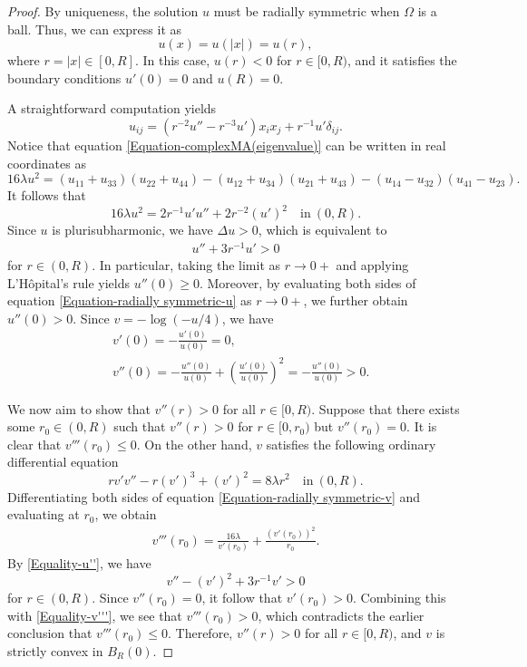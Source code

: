 \documentclass[10pt,a4paper]{amsart}
\begin{document}
\begin{proof}
By uniqueness, the solution $u$ must be radially symmetric when $\Omega$ is a ball. Thus, we can express it as $$u(x)=u(|x|)=u(r), $$ where $r=|x|\in[0,R]$. In this case, $u(r)<0$ for $r\in[0, R)$, and it satisfies the boundary conditions $u'(0)=0$ and $u(R)=0$.
 
A straightforward computation yields $$u_{ij}=\left(r^{-2}u''-r^{-3}u'\right)x_ix_j+r^{-1}u'\delta_{ij}. $$ Notice that equation \eqref{Equation-complexMA(eigenvalue)} can be written in real coordinates as $$16\lambda u^2=(u_{11}+u_{33})(u_{22}+u_{44})-(u_{12}+u_{34})(u_{21}+u_{43})-(u_{14}-u_{32})(u_{41}-u_{23}).$$ It follows that
\begin{equation}\label{Equation-radially symmetric-u}
16\lambda u^2=2r^{-1}u'u''+2r^{-2}(u')^2 \quad \mathrm{in} \ (0, R).
\end{equation}
Since $u$ is plurisubharmonic, we have $\Delta u>0$, which is equivalent to 
\begin{align}\label{Equality-u''}
u''+3r^{-1}u'>0
\end{align} 
for $r\in(0, R)$. In particular, taking the limit as $r\rightarrow0+$ and applying L'H{\^o}pital's rule yields $u''(0)\geq0$. Moreover, by evaluating both sides of equation \eqref{Equation-radially symmetric-u} as $r\rightarrow0+$, we further obtain $u''(0)>0$. Since $v=-\log(-u/4)$, we have 
\begin{align*}
&v'(0)=-\frac{u'(0)}{u(0)}=0, \\
&v''(0)=-\frac{u''(0)}{u(0)}+\left(\frac{u'(0)}{u(0)}\right)^2=-\frac{u''(0)}{u(0)}>0.
\end{align*}
 
We now aim to show that $v''(r)>0$ for all $r\in[0, R)$. Suppose that there exists some $r_0\in(0, R)$ such that $v''(r)>0$ for $r\in[0, r_0)$ but $v''(r_0)=0$. It is clear that $v'''(r_0)\leq0$. On the other hand, $v$ satisfies the following ordinary differential equation 
\begin{equation}\label{Equation-radially symmetric-v}
rv'v''-r(v')^3+(v')^2=8\lambda r^2\quad \mathrm{in} \ (0, R).
\end{equation} 
Differentiating both sides of equation \eqref{Equation-radially symmetric-v} and evaluating at $r_0$, we obtain 
\begin{align}\label{Equality-v'''}
v'''(r_0)=\frac{16\lambda}{v'(r_0)}+\frac{(v'(r_0))^2}{r_0}. 
\end{align} 
By \eqref{Equality-u''}, we have $$v''-(v')^2+3r^{-1}v'>0$$ for $r\in(0, R)$. Since $v''(r_0)=0$, it follow that $v'(r_0)>0$. Combining this with \eqref{Equality-v'''}, we see that $v'''(r_0)>0$, which contradicts the earlier conclusion that $v'''(r_0)\leq0$. Therefore, $v''(r)>0$ for all $r\in[0, R)$, and $v$ is strictly convex in $B_R(0)$.
\end{proof}
\end{document}
